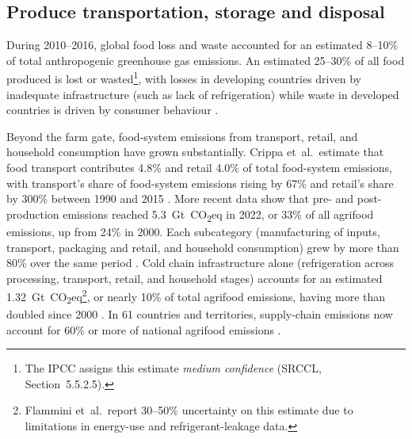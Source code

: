 
\subsection{Produce transportation, storage and disposal}\label{sec:transport}

During 2010--2016, global food loss and waste accounted for an estimated
8--10\% of total anthropogenic greenhouse gas emissions. An estimated
25--30\% of all food
produced is lost or wasted\footnote{The IPCC assigns this estimate
\emph{medium confidence} (SRCCL, Section~5.5.2.5).}, with losses in developing countries driven by inadequate
infrastructure (such as lack of refrigeration) while waste in developed countries is driven by consumer
behaviour
\cite[Section~5.5.2.5]{ipcc2019srccl}.

Beyond the farm gate, food-system emissions from transport, retail, and
household consumption have grown substantially. Crippa et~al.\ estimate
that food transport contributes 4.8\% and retail 4.0\% of total
food-system emissions, with transport's share of food-system emissions rising by 67\% and
retail's share by 300\% between 1990 and 2015
\cite[pp.~200--201]{crippa2021foodghg}. More recent data show that pre- and
post-production emissions reached 5.3~Gt~CO\textsubscript{2}eq in
2022, or 33\% of all agrifood emissions, up from 24\% in
2000. Each subcategory (manufacturing of inputs,
transport, packaging and retail, and household consumption) grew
by more than 80\% over the same period \cite[pp.~3--4]{fao2024ghg}. Cold chain infrastructure alone (refrigeration across processing,
transport, retail, and household stages) accounts for an estimated
1.32~Gt~CO\textsubscript{2}eq\footnote{Flammini et~al.\ report 30--50\%
uncertainty on this estimate due to limitations in energy-use and
refrigerant-leakage data.}, or nearly 10\% of total agrifood emissions,
having more than doubled since 2000 \cite[Section~3]{flammini2024coldchain}. In 61 countries and territories, supply-chain emissions now
account for 60\% or more of national agrifood emissions
\cite[p.~7]{fao2024ghg}.


